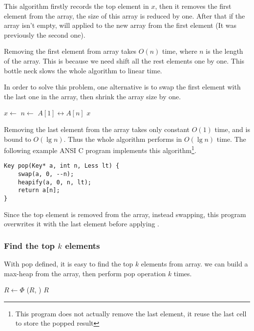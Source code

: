 \documentclass{article}
\begin{document}
This algorithm firstly records the top element in $x$, then
it removes the first element from the array, the size of
this array is reduced by one. After that if the array isn't
empty,  will applied to the new array from
the first element (It was previously the second one).

Removing the first element from array takes $O(n)$ time,
where $n$ is the length of the array. This is because
we need shift all the rest elements one by one.
This bottle neck slows the whole algorithm
to linear time.

In order to solve this problem, one alternative is
to swap the first element with the last one in the
array, then shrink the array size by one.

\begin{algorithmic}[1]
  \State $x \gets$ 
  \State $n \gets$ 
  \State {} $A[1] \leftrightarrow A[n]$
  \State {}
    \State {}
  \EndIf
  \State \Return $x$
\EndFunction
\end{algorithmic}

Removing the last element from the array takes
only constant $O(1)$ time, and  is bound to $O(\lg n)$.
Thus the whole algorithm performs in $O(\lg n)$ time. The following
example ANSI C program implements this algorithm\footnote{This program does not
actually remove the last element, it reuse the last cell to store the popped
result}.

\lstset{language=C}
\begin{lstlisting}
Key pop(Key* a, int n, Less lt) {
    swap(a, 0, --n);
    heapify(a, 0, n, lt);
    return a[n];
}
\end{lstlisting}

Since the top element is removed from the array, instead swapping,
this program overwrites it with the last element before applying
.

\subsubsection{Find the top $k$ elements}

With pop defined, it is easy to
find the top $k$ elements from array.
we can build a max-heap from the array, then perform
pop operation $k$ times.

\begin{algorithmic}[1]
  \State $R \gets \Phi$
  \State {}
    \State {}($R$, )
  \EndFor
  \State \Return $R$
\EndFunction
\end{algorithmic}
\end{document}
